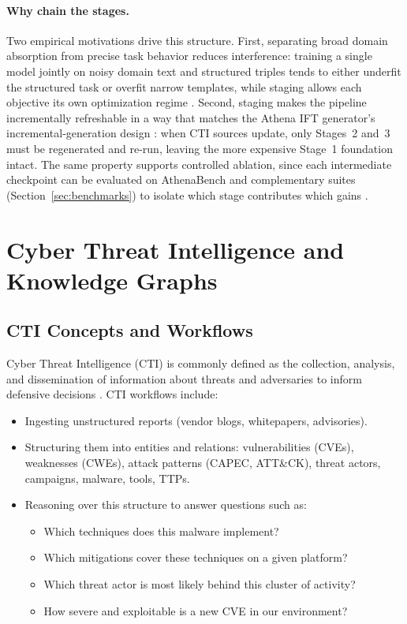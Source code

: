 \documentclass[unnumsec,webpdf,contemporary,large]{oup-authoring-template}
\theoremstyle{thmstyleone}
\theoremstyle{thmstyletwo}
\theoremstyle{thmstylethree}
\begin{document}
\paragraph{Why chain the stages.}
Two empirical motivations drive this structure. First, separating broad domain absorption from precise task behavior reduces interference: training a single model jointly on noisy domain text and structured triples tends to either underfit the structured task or overfit narrow templates, while staging allows each objective its own optimization regime \cite{gururangan2020dontstop,ouyang2022instructgpt}. Second, staging makes the pipeline incrementally refreshable in a way that matches the Athena IFT generator's incremental-generation design \cite{cardei2025ift}: when CTI sources update, only Stages~2 and~3 must be regenerated and re-run, leaving the more expensive Stage~1 foundation intact. The same property supports controlled ablation, since each intermediate checkpoint can be evaluated on AthenaBench and complementary suites (Section~\ref{sec:benchmarks}) to isolate which stage contributes which gains \cite{alam2025athenabench}.



\section{Cyber Threat Intelligence and Knowledge Graphs}
\label{sec:cti-kg}

\subsection{CTI Concepts and Workflows}

Cyber Threat Intelligence (CTI) is commonly defined as the collection, analysis, and dissemination of information about threats and adversaries to inform defensive decisions \cite{mcmillan2013gartner}. CTI workflows include:

\begin{itemize}
  \item Ingesting unstructured reports (vendor blogs, whitepapers, advisories).
  \item Structuring them into entities and relations: vulnerabilities (CVEs), weaknesses (CWEs), attack patterns (CAPEC, ATT\&CK), threat actors, campaigns, malware, tools, TTPs.
  \item Reasoning over this structure to answer questions such as:
    \begin{itemize}
      \item Which techniques does this malware implement?
      \item Which mitigations cover these techniques on a given platform?
      \item Which threat actor is most likely behind this cluster of activity?
      \item How severe and exploitable is a new CVE in our environment?
    \end{itemize}
\end{itemize}
\end{document}

